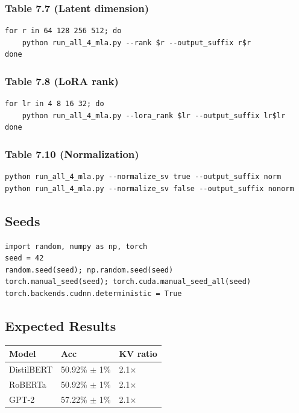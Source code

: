 \subsubsection{Table 7.7 (Latent dimension)}
\begin{lstlisting}
for r in 64 128 256 512; do
    python run_all_4_mla.py --rank $r --output_suffix r$r
done
\end{lstlisting}

\subsubsection{Table 7.8 (LoRA rank)}
\begin{lstlisting}
for lr in 4 8 16 32; do
    python run_all_4_mla.py --lora_rank $lr --output_suffix lr$lr
done
\end{lstlisting}

\subsubsection{Table 7.10 (Normalization)}
\begin{lstlisting}
python run_all_4_mla.py --normalize_sv true --output_suffix norm
python run_all_4_mla.py --normalize_sv false --output_suffix nonorm
\end{lstlisting}

\subsection{Seeds}

\begin{lstlisting}
import random, numpy as np, torch
seed = 42
random.seed(seed); np.random.seed(seed)
torch.manual_seed(seed); torch.cuda.manual_seed_all(seed)
torch.backends.cudnn.deterministic = True
\end{lstlisting}

\subsection{Expected Results}

\begin{table}[H]
\centering
\small
\begin{tabular}{lll}
\toprule
\textbf{Model} & \textbf{Acc} & \textbf{KV ratio} \\
\midrule
DistilBERT & 50.92\% $\pm$ 1\% & 2.1$\times$ \\
RoBERTa & 50.92\% $\pm$ 1\% & 2.1$\times$ \\
GPT-2 & 57.22\% $\pm$ 1\% & 2.1$\times$ \\
\bottomrule
\end{tabular}
\end{table}

